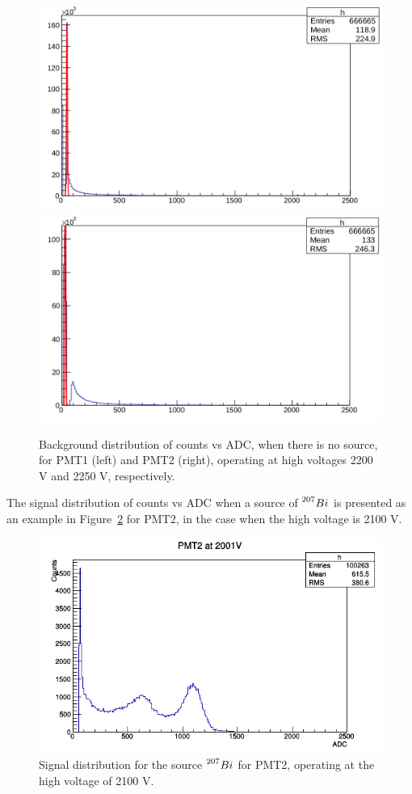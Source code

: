 \documentclass[10pt,swedish, openany]{book}
\begin{document}
\begin{figure}[H]
\includegraphics[scale=0.20]{background1.png}
\includegraphics[scale=0.20]{background2.png}
\centering
\caption{Background distribution of counts vs ADC, when there is no source, for PMT1 (left) and PMT2 (right), operating at high voltages 2200 V and 2250 V, respectively.}
\label{fig:background}
\end{figure}


The signal distribution of counts vs ADC when a source of $\prescript{207}{}{Bi}$ is presented as an example in Figure~\ref{fig:spectrum} for PMT2, in the case when the high voltage is 2100 V. 

\begin{figure}[H]
\includegraphics[scale=0.7]{spectrum.png}
\centering
\caption{Signal distribution for the source $\prescript{207}{}{Bi}$ for PMT2, operating at the high voltage of 2100 V.}
\label{fig:spectrum}
\end{figure}
\end{document}
